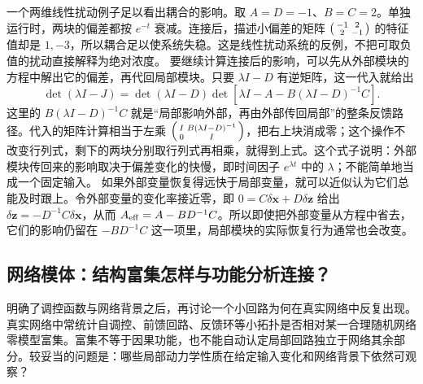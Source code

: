 \documentclass[11pt,a4paper,UTF8,fontset=fandol]{ctexart}
\begin{document}
一个两维线性扰动例子足以看出耦合的影响。取 $A=D=-1$、$B=C=2$。单独运行时，两块的偏差都按 $e^{-t}$ 衰减。连接后，描述小偏差的矩阵
$\begin{psmallmatrix}-1&2\\2&-1\end{psmallmatrix}$ 的特征值却是 $1,-3$，所以耦合足以使系统失稳。这是线性扰动系统的反例，不把可取负值的扰动直接解释为绝对浓度。
要继续计算连接后的影响，可以先从外部模块的方程中解出它的偏差，再代回局部模块。只要 $\lambda I-D$ 有逆矩阵，这一代入就给出
\[
\det(\lambda I-J)=\det(\lambda I-D)
\det\left[\lambda I-A-B(\lambda I-D)^{-1}C\right].
\]
这里的 $B(\lambda I-D)^{-1}C$ 就是“局部影响外部，再由外部传回局部”的整条反馈路径。代入的矩阵计算相当于左乘 $\begin{psmallmatrix}I&B(\lambda I-D)^{-1}\\0&I\end{psmallmatrix}$，把右上块消成零；这个操作不改变行列式，剩下的两块分别取行列式再相乘，就得到上式。这个式子说明：外部模块传回来的影响取决于偏差变化的快慢，即时间因子 $e^{\lambda t}$ 中的 $\lambda$；不能简单地当成一个固定输入。
如果外部变量恢复得远快于局部变量，就可以近似认为它们总能及时跟上。令外部变量的变化率接近零，即 $0=C\delta\bm x+D\delta\bm z$ 给出 $\delta\bm z=-D^{-1}C\delta\bm x$，从而 $A_{\rm eff}=A-BD^{-1}C$。所以即使把外部变量从方程中省去，它们的影响仍留在 $-BD^{-1}C$ 这一项里，局部模块的实际恢复行为通常也会改变。

\subsection{网络模体：结构富集怎样与功能分析连接？}
明确了调控函数与网络背景之后，再讨论一个小回路为何在真实网络中反复出现。
真实网络中常统计自调控、前馈回路、反馈环等小拓扑是否相对某一合理随机网络零模型富集。富集不等于因果功能，也不能自动认定局部回路独立于网络其余部分。较妥当的问题是：哪些局部动力学性质在给定输入变化和网络背景下依然可观察？
\end{document}
